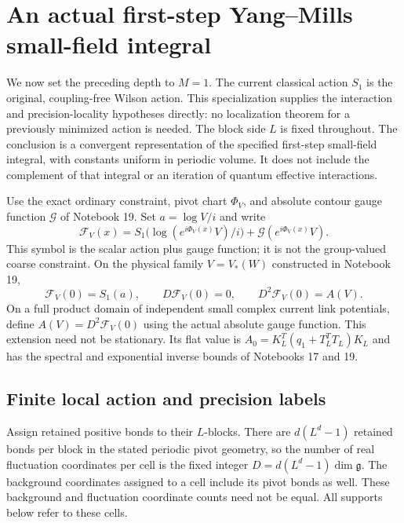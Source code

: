 \section{An actual first-step Yang--Mills small-field integral}
\label{bs-section}

We now set the preceding depth to $M=1$. The current classical
action $S_1$ is the original, coupling-free Wilson action. This
specialization supplies the interaction and precision-locality
hypotheses directly: no localization theorem for a previously
minimized action is needed. The block side $L$ is fixed throughout.
The conclusion is a convergent representation of the specified
first-step small-field integral, with constants uniform in periodic
volume. It does not include the complement of that integral or
an iteration of quantum effective interactions.

Use the exact ordinary constraint, pivot chart $\Phi_V$, and
absolute contour gauge function $\mathcal G$ of Notebook 19.
Set $a=\log V/i$ and write
\begin{equation}\label{bs-action}
 \mathcal F_V(x)=S_1\bigl(\log(e^{i\Phi_V(x)}V)/i\bigr)
                   +\mathcal G(e^{i\Phi_V(x)}V).
\end{equation}
This symbol is the scalar action plus gauge function; it is not
the group-valued coarse constraint. On the physical family
$V=V_*(W)$ constructed in Notebook 19,
\begin{equation}\label{bs-centered}
 \mathcal F_V(0)=S_1(a),\qquad D\mathcal F_V(0)=0,\qquad
 D^2\mathcal F_V(0)=A(V).
\end{equation}
On a full product domain of independent small complex current
link potentials, define $A(V)=D^2\mathcal F_V(0)$ using the
actual absolute gauge function. This extension need not be
stationary. Its flat value is
$A_0=K_L^T(q_1+T_L^TT_L)K_L$ and has the spectral and
exponential inverse bounds of Notebooks 17 and 19.

\subsection{Finite local action and precision labels}

Assign retained positive bonds to their $L$-blocks. There are
$d(L^d-1)$ retained bonds per block in the stated periodic pivot
geometry, so the number of real fluctuation coordinates per
cell is the fixed integer $D=d(L^d-1)\dim\mathfrak g$.
The background coordinates assigned to a cell include its pivot
bonds as well. These background and fluctuation coordinate
counts need not be equal. All supports below refer to these cells.

